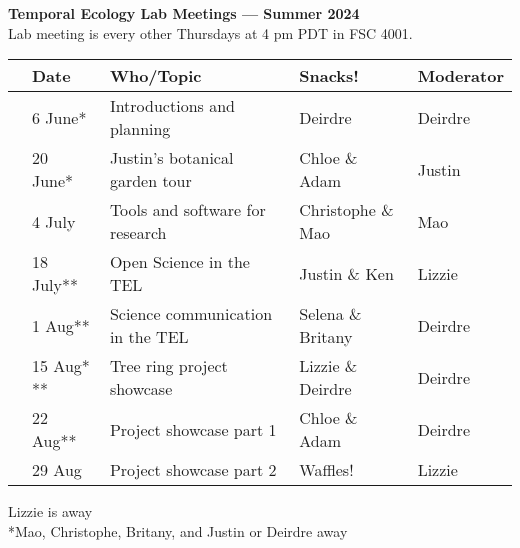 \documentclass[11pt]{article}
\begin{document}
 
\raggedright
{}

\begin{center} 
{\large \textbf{Temporal Ecology Lab Meetings --- Summer 2024}} \\ [2pt]
Lab meeting is every other Thursdays at 4 pm PDT in FSC 4001.\\ %
\end{center} 

\begin{center}
\begin{tabular}{ p{0.2 cm}  p{2 cm}  p{5 cm}  p{3 cm}  p{3 cm} }  \hline \hline
 & \textbf{Date}
   & \textbf{Who/Topic}
      & \textbf{Snacks!} 
         & \textbf{Moderator} \\ 
\hline \hline
& 6 June* & Introductions and planning  &   Deirdre    & Deirdre\\\hline
& 20 June* &  Justin's botanical garden tour &  Chloe \& Adam &  Justin \\\hline
& 4 July &  Tools and software for research & Christophe \& Mao &  Mao\\\hline  
& 18 July** &  Open Science in the TEL &  Justin \&  Ken &  Lizzie \\\hline
& 1 Aug**  & Science communication in the TEL &  Selena \& Britany &  Deirdre \\\hline 
& 15 Aug* ** &   Tree ring project showcase & Lizzie \& Deirdre &  Deirdre\\\hline
& 22 Aug** &   Project showcase part 1 & Chloe \& Adam &  Deirdre \\\hline
& 29 Aug &  Project showcase part 2 & Waffles! & Lizzie\\\hline 
\hline
\end{tabular}
\end{center}
\noindent *Lizzie is away \\
\noindent **Mao, Christophe, Britany, and Justin or Deirdre away
\end{document}
